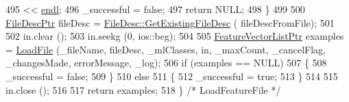 \begin{DoxyCode}
495                    << \hyperlink{namespace_k_k_b_ad1f50f65af6adc8fa9e6f62d007818a8}{endl};
496     \_successful = \textcolor{keyword}{false};
497     \textcolor{keywordflow}{return} NULL;
498   \}
499 
500   \hyperlink{class_k_k_m_l_l_1_1_file_desc}{FileDescPtr} fileDesc = \hyperlink{class_k_k_m_l_l_1_1_file_desc_ab64013b479502d2761a9f11570a565bc}{FileDesc::GetExistingFileDesc} (
      fileDescFromFile);
501 
502   in.clear ();
503   in.seekg (0, ios::beg);
504 
505   \hyperlink{class_k_k_m_l_l_1_1_feature_vector_list}{FeatureVectorListPtr}  examples = \hyperlink{class_k_k_m_l_l_1_1_feature_file_i_o_a49e80ac6eff874c8145559d9453b68d5}{LoadFile} (\_fileName, fileDesc, \_mlClasses, 
      in, \_maxCount, \_cancelFlag, \_changesMade, errorMessage, \_log);
506   \textcolor{keywordflow}{if}  (examples == NULL)
507   \{
508     \_successful = \textcolor{keyword}{false};
509   \}
510   \textcolor{keywordflow}{else}
511   \{
512     \_successful = \textcolor{keyword}{true};
513   \}
514 
515   in.close ();
516 
517   \textcolor{keywordflow}{return}  examples;
518 \}  \textcolor{comment}{/* LoadFeatureFile */}
\end{DoxyCode}
